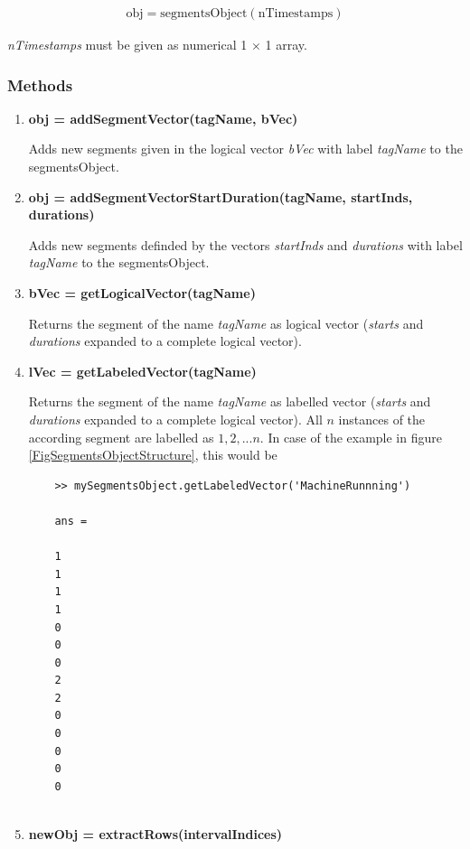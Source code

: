 \documentclass[a4]{scrreprt}
\begin{document}
\begin{align*}
\text{obj} = \text{segmentsObject}(\text{nTimestamps})
\end{align*}

\textit{nTimestamps} must be given as numerical 1 $\times$ 1 array.

\subsubsection{Methods}

\begin{enumerate}
	
	\item \textbf{obj = addSegmentVector(tagName, bVec)}
	
	Adds new segments  given in the logical vector \textit{bVec} with label \textit{tagName} to the segmentsObject.
	
	\item \textbf{obj = addSegmentVectorStartDuration(tagName, startInds, durations)}
	
	Adds new segments  definded by the vectors \textit{startInds} and \textit{durations} with label \textit{tagName} to the segmentsObject.
	
	\item \textbf{bVec = getLogicalVector(tagName)}
	
	Returns the segment of the name \textit{tagName} as logical vector (\textit{starts} and \textit{durations} expanded to a complete logical vector).
	
	\item \textbf{lVec = getLabeledVector(tagName)}
	
	Returns the segment of the name \textit{tagName} as labelled vector (\textit{starts} and \textit{durations} expanded to a complete logical vector). All $n$ instances of the according segment are labelled as $1, 2, ... n$. In case of the example in figure \ref{FigSegmentsObjectStructure}, this would be 
	
	\begin{verbatim}
	>> mySegmentsObject.getLabeledVector('MachineRunnning')
	
	ans = 
	
	1 
	1 
	1 
	1 
	0 
	0
	0
	2
	2
	0
	0
	0
	0
	0
	
	\end{verbatim}
	
	\item \textbf{newObj = extractRows(intervalIndices)}
	

\end{enumerate}
\end{document}
